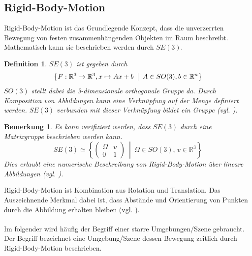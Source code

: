 \documentclass[12pt,DIV=15,BCOR=15mm,twoside,headsepline,abstract=true,listof=totoc,bibliography=totoc]{scrreprt}
\newtheorem{remark}{Bemerkung}[chapter]
\newtheorem{defi}{Definition}
\theoremstyle{remark}    %
\begin{document}
    \subsection{Rigid-Body-Motion}
    Rigid-Body-Motion ist das Grundlegende Konzept, dass die unverzerrten Bewegung von festen zusammenhängenden Objekten im Raum beschreibt. 
    Mathematisch kann sie beschrieben werden durch $SE(3)$. \cite{Murray1994}
    \begin{defi}
        $SE(3)$ ist gegeben durch 
        \begin{equation}
            \left\{F: \mathbb{R}^3 \to \mathbb{R}^3, x \mapsto Ax + b \hspace{0.5em} \middle| \hspace{0.5em} A \in SO(3), b \in \mathbb{R}^n\right\}
        \end{equation}
        $SO(3)$ stellt dabei die 3-dimensionale orthogonale Gruppe da. 
        Durch Komposition von Abbildungen kann eine Verknüpfung auf der Menge definiert werden. $SE(3)$ verbunden mit dieser Verknüpfung bildet 
        ein Gruppe (vgl. \cite{Murray1994}).
    \end{defi}
    \begin{remark} \label{bem:hom_coords}
    Es kann verifiziert werden, dass $SE(3)$ durch eine Matrixgruppe beschrieben werden kann. \[
        SE(3)  \simeq 
            \left\{
            \begin{pmatrix}
            \Omega & v \\[3pt]
            0 & 1
            \end{pmatrix}
            \ \middle|\ 
            \Omega \in SO(3),\, v \in \mathbb{R}^3
            \right\}
    \]Dies erlaubt eine numerische Beschreibung von Rigid-Body-Motion über lineare Abbildungen (vgl. \cite{Murray1994}).
    \end{remark} \noindent
    Rigid-Body-Motion ist Kombination aus Rotation und Translation. Das Auszeichnende Merkmal dabei ist, dass Abstände und Orientierung von Punkten
    durch die Abbildung erhalten bleiben (vgl. \cite{Murray1994}).\\\\
    Im folgender wird häufig der Begriff einer starre Umgebungen/Szene gebraucht. Der Begriff bezeichnet eine Umgebung/Szene dessen Bewegung zeitlich 
    durch Rigid-Body-Motion beschrieben.
\end{document}
